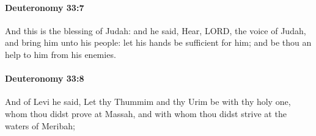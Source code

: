 		\paragraph{Deuteronomy 33:7} %
			\label{DEUTERONOMY-33-7}

			And this is the blessing of Judah: and he said, Hear, LORD, the voice of Judah, and bring him unto his people: let his hands be sufficient for him; and be thou an help to him from his enemies.


		\paragraph{Deuteronomy 33:8} %
			\label{DEUTERONOMY-33-8}

			And of Levi he said, Let thy Thummim and thy Urim be with thy holy one, whom thou didst prove at Massah, and with whom thou didst strive at the waters of Meribah;

